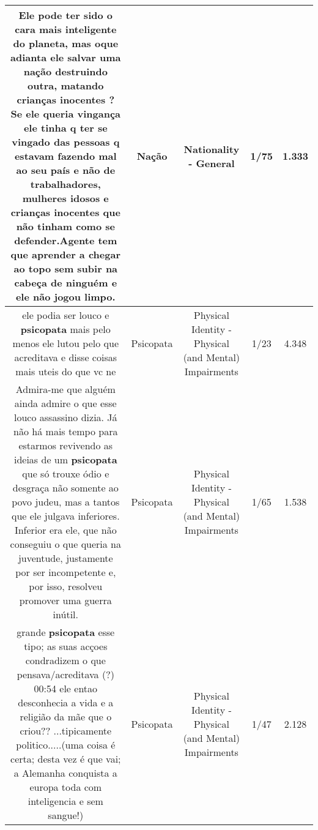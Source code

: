 \documentclass[11pt]{article}
\newlength\mylength
\begin{document}
\begin{center}
\begin{longtable}{|C{.65\mylength}|C{.30\mylength}|C{.12\mylength}|C{.12\mylength}|C{.12\mylength}|}
  \small Ele pode ter sido o cara mais inteligente do planeta, mas oque adianta ele salvar uma \textbf{nação} destruindo outra, matando crianças inocentes ? Se ele queria vingança ele tinha q ter se vingado das pessoas q estavam fazendo mal ao seu país e não de trabalhadores, mulheres idosos e crianças inocentes que não tinham como se defender.Agente tem que aprender a chegar ao topo sem subir na cabeça de ninguém e ele não jogou limpo.\normalsize   & Nação & Nationality - General & 1/75 & 1.333 \\  \hline
  \small ele podia ser louco e \textbf{psicopata} mais pelo menos ele lutou pelo que acreditava e disse coisas mais uteis do que vc ne\normalsize   & Psicopata & Physical Identity - Physical (and Mental) Impairments & 1/23 & 4.348 \\  \hline
  \small Admira-me que alguém ainda admire o que esse louco assassino dizia. Já não há mais tempo para estarmos revivendo as ideias de um \textbf{psicopata} que só trouxe ódio e desgraça não somente ao povo judeu, mas a tantos que ele julgava inferiores. Inferior era ele, que não conseguiu o que queria na juventude, justamente por ser incompetente e, por isso, resolveu promover uma guerra inútil.\normalsize   & Psicopata & Physical Identity - Physical (and Mental) Impairments & 1/65 & 1.538 \\  \hline
  \small grande \textbf{psicopata} esse tipo; as suas acçoes condradizem o que pensava/acreditava (?)   00:54 ele entao desconhecia a vida e a religião da mãe que o criou?? ...tipicamente politico.....(uma coisa é certa; desta vez é que vai; a Alemanha conquista a europa toda com inteligencia e sem sangue!)\normalsize   & Psicopata & Physical Identity - Physical (and Mental) Impairments & 1/47 & 2.128 \\  \hline
  
\end{longtable}
\end{center}
\end{document}
